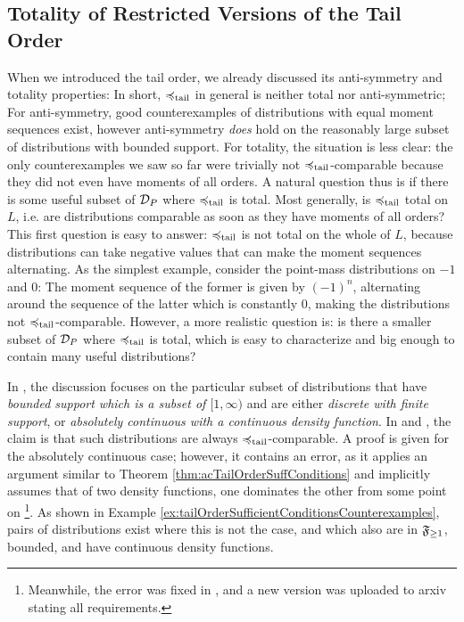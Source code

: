 \documentclass[a4paper]{scrreprt}
\begin{document}
    \subsection{Totality of Restricted Versions of the Tail Order}
    When we introduced the tail order, we already discussed its anti-symmetry and totality properties: In short, $\preccurlyeq_{\text{tail}}$ in general is neither total nor anti-symmetric; For anti-symmetry, good counterexamples of distributions with equal moment sequences exist, however anti-symmetry \emph{does} hold on the reasonably large subset of distributions with bounded support.
    For totality, the situation is less clear: the only counterexamples we saw so far were trivially not $\preccurlyeq_{\text{tail}}$-comparable because they did not even have moments of all orders.
    A natural question thus is if there is some useful subset of $\mathcal{D}_P$ where $\preccurlyeq_{\text{tail}}$ is total. Most generally, is $\preccurlyeq_{\text{tail}}$ total on $L$, i.e. are distributions comparable as soon as  they have moments of all orders? This first question is easy to answer: $\preccurlyeq_{\text{tail}}$ is not total on the whole of $L$, because distributions can take negative values that can make the moment sequences alternating. 
    As the simplest example, consider the point-mass distributions on $-1$ and $0$: The moment sequence of the former is given by $(-1)^n$, alternating around the sequence of the latter which is constantly $0$, making the distributions not $\preccurlyeq_{\text{tail}}$-comparable.
    However, a more realistic question is: is there a smaller subset of $\mathcal{D}_P$ where $\preccurlyeq_{\text{tail}}$ is total, which is easy to characterize and big enough to contain many useful distributions?
    
    In \cite{bib:rassGameRiskManagI,bib:rassTotalOrderingOnLossDistributions}, the discussion focuses on the particular subset of distributions that have \emph{bounded support which is a subset of $[1, \infty)$} and are either \emph{discrete with finite support}, or \emph{absolutely continuous with a continuous density function}.
    In \cite[Lemma 2]{bib:rassTotalOrderingOnLossDistributions} and \cite[Lemma 2.4]{bib:rassGameRiskManagI}, the claim is that such distributions are always $\preccurlyeq_{\text{tail}}$-comparable.
    A proof is given for the absolutely continuous case; however, it contains an error, as it applies an argument similar to Theorem \ref{thm:acTailOrderSuffConditions} and implicitly assumes that of two density functions, one dominates the other from some point on
    \footnote{Meanwhile, the error was fixed in \cite{bib:rassGameRiskManagI}, and a new version was uploaded to arxiv stating all requirements.}.
    As shown in Example \ref{ex:tailOrderSufficientConditionsCounterexamples}, pairs of distributions exist where this is not the case, and which also are in $\mathfrak{F}_{\geq 1}$, bounded, and have continuous density functions.
    
\end{document}
